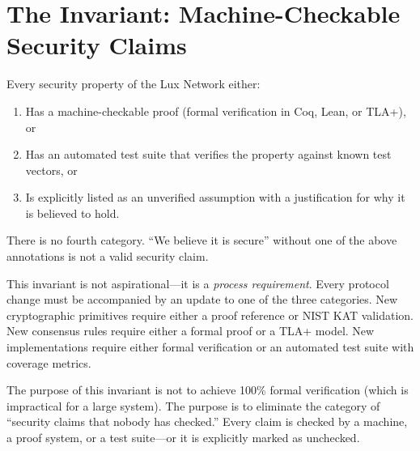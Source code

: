 \section{The Invariant: Machine-Checkable Security Claims}

\label{sec:invariant}

\begin{invariant}
Every security property of the Lux Network either:
\begin{enumerate}[leftmargin=2em]
  \item Has a machine-checkable proof (formal verification in Coq, Lean, or TLA+), or
  \item Has an automated test suite that verifies the property against known test
        vectors, or
  \item Is explicitly listed as an unverified assumption with a justification for
        why it is believed to hold.
\end{enumerate}
There is no fourth category. ``We believe it is secure'' without one of the above
annotations is not a valid security claim.
\end{invariant}

This invariant is not aspirational---it is a \emph{process requirement}. Every
protocol change must be accompanied by an update to one of the three categories.
New cryptographic primitives require either a proof reference or NIST KAT validation.
New consensus rules require either a formal proof or a TLA+ model. New implementations
require either formal verification or an automated test suite with coverage metrics.

The purpose of this invariant is not to achieve 100\% formal verification (which is
impractical for a large system). The purpose is to eliminate the category of
``security claims that nobody has checked.'' Every claim is checked by a machine, a
proof system, or a test suite---or it is explicitly marked as unchecked.


